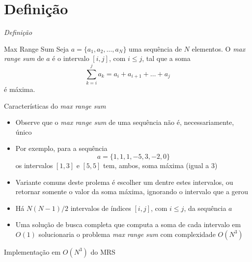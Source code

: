 \section{Definição}

\begin{frame}[fragile]{{\it Definição}}

    \begin{block}{Max Range Sum}
        Seja $a = \{a_1, a_2, \ldots, a_N\}$ uma sequência de $N$ elementos. O \textit{max range
            sum} de $a$ é o intervalo $[i, j]$, com $i \leq j$, tal que a soma
        \[
            \sum_{k = i}^j a_k = a_i + a_{i + 1} + \ldots + a_j
        \]
        é máxima.
    \end{block}

\end{frame}

\begin{frame}[fragile]{Características do {\it max range sum}}

    \begin{itemize}
        \item Observe que o \textit{max range sum} de uma sequência não é, necessariamente,
            único

        \item Por exemplo, para a sequência
        \[
            a = \{ 1, 1, 1, -5, 3, -2, 0 \}
        \]
        os intervalos $[1, 3]$ e $[5, 5]$ tem, ambos, soma máxima (igual a 3)

        \item Variante comuns deste prolema é  escolher um dentre estes intervalos, ou retornar
            somente o valor da soma máxima, ignorando o intervalo que a gerou

        \item Há $N(N - 1)/2$ intervalos de índices $[i, j]$, com $i\leq j$, da sequência $a$

        \item Uma solução de busca completa que computa a soma de cada intervalo em $O(1)$
            solucionaria o problema \textit{max range sum} com complexidade $O(N^3)$

    \end{itemize}

\end{frame}

\begin{frame}[fragile]{Implementação em $O(N^3)$ do MRS}
\end{frame}

